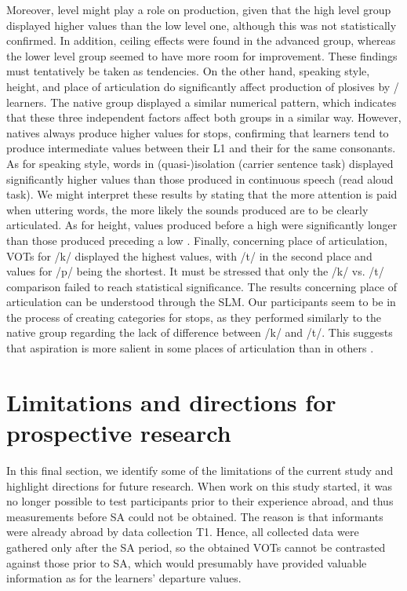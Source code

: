 \documentclass[output=paper]{langsci/langscibook}
\begin{document}
  Moreover,  level might play a role on  production, given that the high level group displayed higher values than the low level one, although this was not statistically confirmed. In addition, ceiling effects were found in the advanced group, whereas the lower level group seemed to have more room for improvement. These findings must tentatively be taken as tendencies. On the other hand, speaking style,  height, and place of articulation do significantly affect  production of  plosives by / learners. The native group displayed a similar numerical pattern, which indicates that these three independent factors affect both groups in a similar way. However, natives always produce higher  values for   stops, confirming that  learners tend to produce intermediate  values between their L1 and their  for the same consonants. As for speaking style, words in (quasi-)isolation (carrier sentence task) displayed significantly higher values than those produced in continuous speech (read aloud task). We might interpret these results by stating that the more attention is paid when uttering words, the more likely the sounds produced are to be clearly articulated. As for  height,  values produced before a high  were significantly longer than those produced preceding a low . Finally, concerning place of articulation, VOTs for /k/ displayed the highest values, with /t/ in the second place and values for /p/ being the shortest. It must be stressed that only the /k/ vs. /t/ comparison failed to reach statistical significance. The results concerning place of articulation can be understood through the SLM. Our participants seem to be in the process of creating  categories for  stops, as they performed similarly to the native group regarding the lack of difference between /k/ and /t/. This suggests that aspiration is more salient in some places of articulation than in others \cite{AlvesZimmer2015}.



\section{Limitations and directions for prospective research}


In this final section, we identify some of the limitations of the current study and highlight directions for future research. When work on this study started, it was no longer possible to test participants prior to their experience abroad, and thus  measurements before SA could not be obtained. The reason is that informants were already abroad by data collection T1. Hence, all collected data were gathered only after the SA period, so the obtained VOTs cannot be contrasted against those prior to SA, which would presumably have provided valuable information as for the learners’  departure values.
\end{document}

